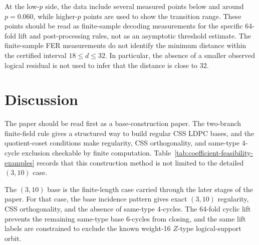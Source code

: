 \documentclass[11pt,a4paper]{article}
\theoremstyle{uprighttheorem}
\begin{document}
At the low-$p$ side, the data include several measured points below and around \(p=0.060\), while higher-$p$ points are used to show the transition range.
These points should be read as finite-sample decoding measurements for the specific 64-fold lift and post-processing rules, not as an asymptotic threshold estimate.
The finite-sample FER measurements do not identify the minimum distance within the certified interval $18\le d\le32$.
In particular, the absence of a smaller observed logical residual is not used to infer that the distance is close to $32$.

\section{Discussion}
The paper should be read first as a base-construction paper.
The two-branch finite-field rule gives a structured way to build regular CSS LDPC bases, and the quotient-coset conditions make regularity, CSS orthogonality, and same-type 4-cycle exclusion checkable by finite computation.
Table~\ref{tab:coefficient-feasibility-examples} records that this construction method is not limited to the detailed \((3,10)\) case.

The \((3,10)\) base is the finite-length case carried through the later stages of the paper.
For that case, the base incidence pattern gives exact \((3,10)\) regularity, CSS orthogonality, and the absence of same-type 4-cycles.
The 64-fold cyclic lift prevents the remaining same-type base 6-cycles from closing, and the same lift labels are constrained to exclude the known weight-16 \(Z\)-type logical-support orbit.
\end{document}
